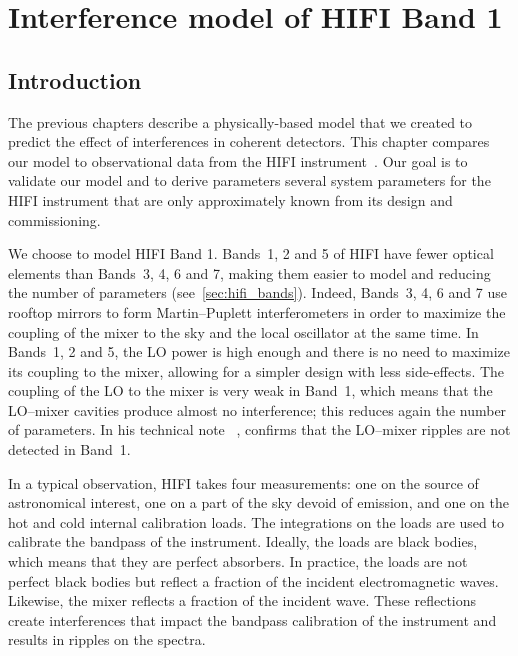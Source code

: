 \cleardoublepage
\chapter{Interference model of HIFI Band 1}
\label{sec:chapter4}


\section{Introduction}
The previous chapters describe a physically-based model that we created to predict the effect of interferences in coherent detectors.
This chapter compares our model to observational data from the HIFI instrument~\cite{AA_518_L6}.
Our goal is to validate our model and to derive parameters several system parameters for the HIFI instrument that are only approximately known from its design and commissioning.

We choose to model HIFI Band 1.
Bands~1, 2 and 5 of HIFI have fewer optical elements than Bands~3, 4, 6 and 7, making them easier to model and reducing the number of parameters (see~\cref{sec:hifi_bands}).
Indeed, Bands~3, 4, 6 and 7 use rooftop mirrors to form Martin--Puplett interferometers in order to maximize the coupling of the mixer to the sky and the local oscillator at the same time.
In Bands~1, 2 and 5, the LO power is high enough and there is no need to maximize its coupling to the mixer, allowing for a simpler design with less side-effects.
The coupling of the LO to the mixer is very weak in Band~1, which means that the LO--mixer cavities produce almost no interference;
this reduces again the number of parameters.
In his technical note ~\cite{risacher2011standingwaves}, \citeauthor{risacher2011standingwaves} confirms that the LO--mixer ripples are not detected in Band~1.

In a typical observation, HIFI takes four measurements: one on the source of astronomical interest, one on a part of the sky devoid of emission, and one on the hot and cold internal calibration loads.
The integrations on the loads are used to calibrate the bandpass of the instrument.
Ideally, the loads are black bodies, which means that they are perfect absorbers.
In practice, the loads are not perfect black bodies but reflect a fraction of the incident electromagnetic waves.
Likewise, the mixer reflects a fraction of the incident wave.
These reflections create interferences that impact the bandpass calibration of the instrument and results in ripples on the spectra.




